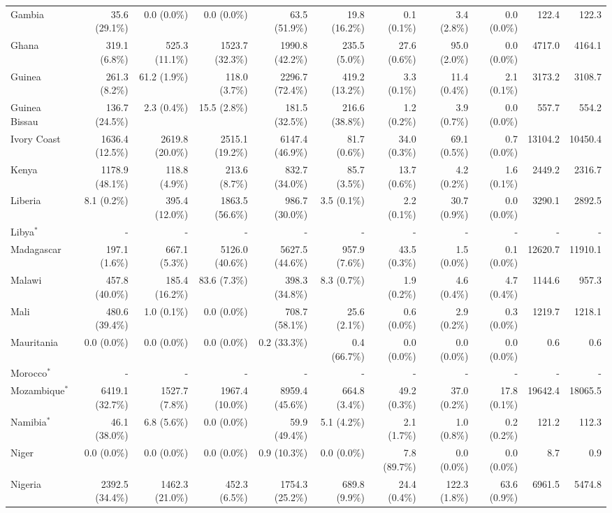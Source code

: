 \begin{scriptsize}
\begin{landscape}
\begin{center}
\begin{longtable}[ht]{lrrrrrrrrrr}
			Gambia&35.6 (29.1\%)&0.0 (0.0\%)&0.0 (0.0\%)&63.5 (51.9\%)&19.8 (16.2\%)&0.1 (0.1\%)&3.4 (2.8\%)&0.0 (0.0\%)&122.4&122.3\\
			Ghana&319.1 (6.8\%)&525.3 (11.1\%)&1523.7 (32.3\%)&1990.8 (42.2\%)&235.5 (5.0\%)&27.6 (0.6\%)&95.0 (2.0\%)&0.0 (0.0\%)&4717.0&4164.1\\
			Guinea&261.3 (8.2\%)&61.2 (1.9\%)&118.0 (3.7\%)&2296.7 (72.4\%)&419.2 (13.2\%)&3.3 (0.1\%)&11.4 (0.4\%)&2.1 (0.1\%)&3173.2&3108.7\\
			Guinea Bissau&136.7 (24.5\%)&2.3 (0.4\%)&15.5 (2.8\%)&181.5 (32.5\%)&216.6 (38.8\%)&1.2 (0.2\%)&3.9 (0.7\%)&0.0 (0.0\%)&557.7&554.2\\
			Ivory Coast&1636.4 (12.5\%)&2619.8 (20.0\%)&2515.1 (19.2\%)&6147.4 (46.9\%)&81.7 (0.6\%)&34.0 (0.3\%)&69.1 (0.5\%)&0.7 (0.0\%)&13104.2&10450.4\\
			Kenya&1178.9 (48.1\%)&118.8 (4.9\%)&213.6 (8.7\%)&832.7 (34.0\%)&85.7 (3.5\%)&13.7 (0.6\%)&4.2 (0.2\%)&1.6 (0.1\%)&2449.2&2316.7\\
			Liberia&8.1 (0.2\%)&395.4 (12.0\%)&1863.5 (56.6\%)&986.7 (30.0\%)&3.5 (0.1\%)&2.2 (0.1\%)&30.7 (0.9\%)&0.0 (0.0\%)&3290.1&2892.5\\
			Libya$^*$&-&-&-&-&-&-&-&-&-&-\\
			Madagascar&197.1 (1.6\%)&667.1 (5.3\%)&5126.0 (40.6\%)&5627.5 (44.6\%)&957.9 (7.6\%)&43.5 (0.3\%)&1.5 (0.0\%)&0.1 (0.0\%)&12620.7&11910.1\\
			Malawi&457.8 (40.0\%)&185.4 (16.2\%)&83.6 (7.3\%)&398.3 (34.8\%)&8.3 (0.7\%)&1.9 (0.2\%)&4.6 (0.4\%)&4.7 (0.4\%)&1144.6&957.3\\
			Mali&480.6 (39.4\%)&1.0 (0.1\%)&0.0 (0.0\%)&708.7 (58.1\%)&25.6 (2.1\%)&0.6 (0.0\%)&2.9 (0.2\%)&0.3 (0.0\%)&1219.7&1218.1\\
			Mauritania&0.0 (0.0\%)&0.0 (0.0\%)&0.0 (0.0\%)&0.2 (33.3\%)&0.4 (66.7\%)&0.0 (0.0\%)&0.0 (0.0\%)&0.0 (0.0\%)&0.6&0.6\\
			Morocco$^*$&-&-&-&-&-&-&-&-&-&-\\
			Mozambique$^*$&6419.1 (32.7\%)&1527.7 (7.8\%)&1967.4 (10.0\%)&8959.4 (45.6\%)&664.8 (3.4\%)&49.2 (0.3\%)&37.0 (0.2\%)&17.8 (0.1\%)&19642.4&18065.5\\
			Namibia$^*$&46.1 (38.0\%)&6.8 (5.6\%)&0.0 (0.0\%)&59.9 (49.4\%)&5.1 (4.2\%)&2.1 (1.7\%)&1.0 (0.8\%)&0.2 (0.2\%)&121.2&112.3\\
			Niger&0.0 (0.0\%)&0.0 (0.0\%)&0.0 (0.0\%)&0.9 (10.3\%)&0.0 (0.0\%)&7.8 (89.7\%)&0.0 (0.0\%)&0.0 (0.0\%)&8.7&0.9\\
			Nigeria&2392.5 (34.4\%)&1462.3 (21.0\%)&452.3 (6.5\%)&1754.3 (25.2\%)&689.8 (9.9\%)&24.4 (0.4\%)&122.3 (1.8\%)&63.6 (0.9\%)&6961.5&5474.8\\

\end{longtable}
\end{center}
\end{landscape}
\end{scriptsize}
